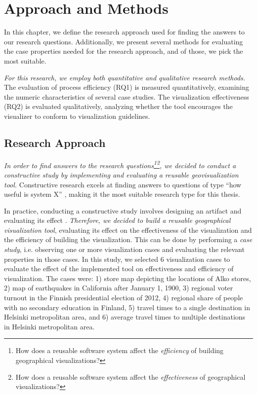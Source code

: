 
\chapter{Approach and Methods}
\label{chapter:methods}

In this chapter, we define the research approach used for finding the answers to our research questions. Additionally, we present several methods for evaluating the case properties needed for the research approach, and of those, we pick the most suitable.

\emph{For this research, we employ both quantitative and qualitative research methods.} The evaluation of process efficiency (RQ1) is measured quantitatively, examining the numeric characteristics of several case studies. The visualization effectiveness (RQ2) is evaluated qualitatively, analyzing whether the tool encourages the visualizer to conform to visualization guidelines.

\section{Research Approach}

\emph{In order to find answers to the research questions\footnote{How does a reusable software system affect the \emph{efficiency} of building geographical visualizations?}\footnote{How does a reusable software system affect the \emph{effectiveness} of geographical visualizations?}, we decided to conduct a constructive study by implementing and evaluating a reusable geovisualization tool.} Constructive research excels at finding answers to questions of type ``how useful is system X'' \citep{jarvinen_tutkimustyon_2012}, making it the most suitable research type for this thesis.

In practice, conducting a constructive study involves designing an artifact and evaluating its effect \citep{jarvinen_tutkimustyon_2012}. \emph{Therefore, we decided to build a reusable geographical visualization tool}, evaluating its effect on the effectiveness of the visualization and the efficiency of building the visualization. This can be done by performing a \emph{case study}, i.e. observing one or more visualization cases and evaluating the relevant properties in those cases. In this study, we selected 6 visualization cases to evaluate the effect of the implemented tool on effectiveness and efficiency of visualization. The cases were: 1) store map depicting the locations of Alko stores, 2) map of earthquakes in California after January 1, 1900, 3) regional voter turnout in the Finnish presidential election of 2012, 4) regional share of people with no secondary education in Finland, 5) travel times to a single destination in Helsinki metropolitan area, and 6) average travel times to multiple destinations in Helsinki metropolitan area.

